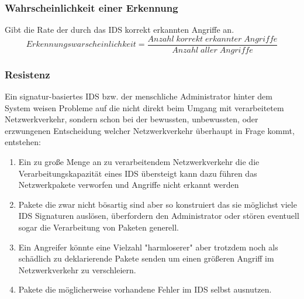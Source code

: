\subsubsection{Wahrscheinlichkeit einer Erkennung}
Gibt die Rate der durch das IDS korrekt erkannten Angriffe an.\\
\[Erkennungswarscheinlichkeit  = \frac{Anzahl\;korrekt\;erkannter\;Angriffe} {Anzahl\;aller\;Angriffe}\]
\subsubsection{Resistenz}
Ein signatur-basiertes IDS bzw. der menschliche Administrator hinter dem System weisen Probleme auf die nicht direkt beim Umgang mit verarbeitetem Netzwerkverkehr, sondern schon bei der bewussten, unbewussten, oder erzwungenen Entscheidung welcher Netzwerkverkehr überhaupt in Frage kommt, entstehen:
\begin{enumerate}
\item{Ein zu große Menge an zu verarbeitendem Netzwerkverkehr die die Verarbeitungskapazität eines IDS übersteigt kann dazu führen das Netzwerkpakete verworfen und Angriffe nicht erkannt werden}
\item{Pakete die zwar nicht bösartig sind aber so konstruiert das sie möglichst viele IDS Signaturen auslösen, überfordern den Administrator oder stören eventuell sogar die Verarbeitung von Paketen generell. }
\item{Ein Angreifer könnte eine Vielzahl "harmloserer" aber trotzdem noch als schädlich zu deklarierende Pakete senden um einen größeren Angriff im Netzwerkverkehr zu verschleiern.}
\item{Pakete die möglicherweise vorhandene Fehler im IDS selbst ausnutzen.}
\end{enumerate}
